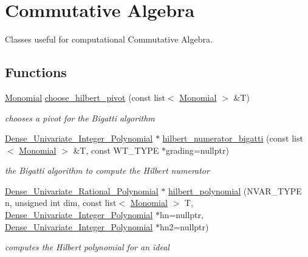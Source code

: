 \hypertarget{group__commalg}{}\section{Commutative Algebra}
\label{group__commalg}


Classes useful for computational Commutative Algebra.  


\subsection*{Functions}
\begin{DoxyCompactItemize}
\item 
\hyperlink{group__polygroup_class_monomial}{Monomial} \hyperlink{group__commalg_ga052ae2e711aaf6d332a8aed218ce9ef9}{choose\+\_\+hilbert\+\_\+pivot} (const list$<$ \hyperlink{group__polygroup_class_monomial}{Monomial} $>$ \&T)
\begin{DoxyCompactList}\small\item\em chooses a pivot for the Bigatti algorithm \end{DoxyCompactList}\item 
\hyperlink{group__polygroup_class_dense___univariate___integer___polynomial}{Dense\+\_\+\+Univariate\+\_\+\+Integer\+\_\+\+Polynomial} $\ast$ \hyperlink{group__commalg_ga7ea0076f04ca9380641ff2af7c9a6e42}{hilbert\+\_\+numerator\+\_\+bigatti} (const list$<$ \hyperlink{group__polygroup_class_monomial}{Monomial} $>$ \&T, const W\+T\+\_\+\+T\+Y\+PE $\ast$grading=nullptr)
\begin{DoxyCompactList}\small\item\em the Bigatti algorithm to compute the Hilbert numerator \cite{Bigatti97} \end{DoxyCompactList}\item 
\hyperlink{group__polygroup_class_dense___univariate___rational___polynomial}{Dense\+\_\+\+Univariate\+\_\+\+Rational\+\_\+\+Polynomial} $\ast$ \hyperlink{group__commalg_ga717dcd7b189f83e0b60e2257d23c6bb9}{hilbert\+\_\+polynomial} (N\+V\+A\+R\+\_\+\+T\+Y\+PE n, unsigned int dim, const list$<$ \hyperlink{group__polygroup_class_monomial}{Monomial} $>$ T, \hyperlink{group__polygroup_class_dense___univariate___integer___polynomial}{Dense\+\_\+\+Univariate\+\_\+\+Integer\+\_\+\+Polynomial} $\ast$hn=nullptr, \hyperlink{group__polygroup_class_dense___univariate___integer___polynomial}{Dense\+\_\+\+Univariate\+\_\+\+Integer\+\_\+\+Polynomial} $\ast$hn2=nullptr)
\begin{DoxyCompactList}\small\item\em computes the Hilbert polynomial for an ideal \end{DoxyCompactList}\item 

\end{DoxyCompactItemize}
